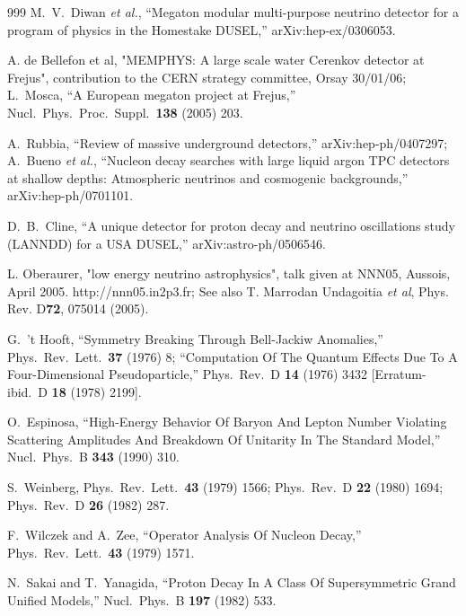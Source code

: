 \begin{thebibliography}{999}
  M.~V.~Diwan {\it et al.},
  ``Megaton modular multi-purpose neutrino detector for a program of  physics
  in the Homestake DUSEL,''
  arXiv:hep-ex/0306053.

A. de Bellefon et al, "MEMPHYS: A large scale water Cerenkov detector at Frejus", 
contribution to the CERN strategy committee, Orsay 30/01/06;
  L.~Mosca,
  ``A European megaton project at Frejus,''
  Nucl.\ Phys.\ Proc.\ Suppl.\  {\bf 138} (2005) 203.

  A.~Rubbia,
  ``Review of massive underground detectors,''
  arXiv:hep-ph/0407297; A.~Bueno {\it et al.},
  ``Nucleon decay searches with large liquid argon TPC detectors at shallow 
depths: Atmospheric neutrinos and cosmogenic backgrounds,''
  arXiv:hep-ph/0701101.


  D.~B.~Cline,
  ``A unique detector for proton decay and neutrino oscillations study (LANNDD)
  for a USA DUSEL,''
  arXiv:astro-ph/0506546.

L. Oberaurer, "low energy neutrino astrophysics", talk given at NNN05, Aussois, April 2005.
 http://nnn05.in2p3.fr; See also T. Marrodan Undagoitia \textit{et
al}, Phys. Rev. D{\bf 72}, 075014 (2005).

  G.~'t Hooft,
  ``Symmetry Breaking Through Bell-Jackiw Anomalies,''
  Phys.\ Rev.\ Lett.\  {\bf 37} (1976) 8;
  ``Computation Of The Quantum Effects Due To A Four-Dimensional
  Pseudoparticle,''
  Phys.\ Rev.\ D {\bf 14} (1976) 3432
  [Erratum-ibid.\ D {\bf 18} (1978) 2199].

  O.~Espinosa,
  ``High-Energy Behavior Of Baryon And Lepton Number Violating Scattering
  Amplitudes And Breakdown Of Unitarity In The Standard Model,''
  Nucl.\ Phys.\ B {\bf 343} (1990) 310.

S.~Weinberg,
Phys.\ Rev.\ Lett.\  {\bf 43} (1979) 1566; 
Phys.\ Rev.\ D {\bf 22} (1980) 1694; 
Phys.\ Rev.\ D {\bf 26} (1982) 287.

  F.~Wilczek and A.~Zee,
  ``Operator Analysis Of Nucleon Decay,''
  Phys.\ Rev.\ Lett.\  {\bf 43} (1979) 1571.

  N.~Sakai and T.~Yanagida,
  ``Proton Decay In A Class Of Supersymmetric Grand Unified Models,''
  Nucl.\ Phys.\ B {\bf 197} (1982) 533.


\end{thebibliography}
